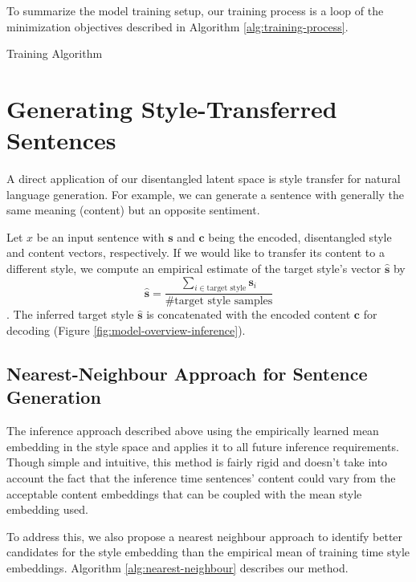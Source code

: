 To summarize the model training setup, our training process is a loop of the minimization objectives described in Algorithm \ref{alg:training-process}.

\begin{algorithm}[H]
	\caption{\label{alg:training-process} Training Algorithm}
\end{algorithm}


\section{Generating Style-Transferred Sentences} \label{ssec:generating-novel-text}

A direct application of our disentangled latent space is style transfer for natural language generation. For example, we can generate a sentence with generally the same meaning (content) but an opposite sentiment.

Let $x$ be an input sentence with $\bm s$ and $\bm c$ being the encoded, disentangled style and content vectors, respectively. If we would like to transfer its content to a different style, we compute an empirical estimate of the target style's vector $\hat{\bm s}$ by
$$\hat{\bm s}=\frac{\sum_{i\in\text{target style}}\bm s_i}{\text{\# target style samples}}$$. The inferred target style $\hat{\bm s}$ is concatenated with the encoded content $\bm c$ for decoding (Figure \ref{fig:model-overview-inference}).


\subsection{Nearest-Neighbour Approach for Sentence Generation} \label{ssec:nearest-neighbour-inference}

The inference approach described above using the empirically learned mean embedding in the style space and applies it to all future inference requirements. Though simple and intuitive, this method is fairly rigid and doesn't take into account the fact that the inference time sentences' content could vary from the acceptable content embeddings that can be coupled with the mean style embedding used.

To address this, we also propose a nearest neighbour approach to identify better candidates for the style embedding than the empirical mean of training time style embeddings. Algorithm \ref{alg:nearest-neighbour} describes our method.

